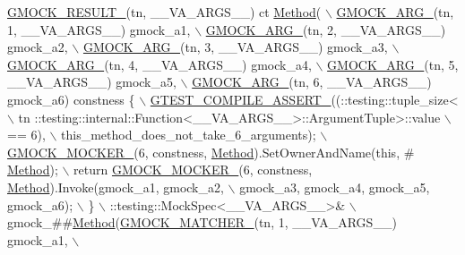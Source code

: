 \begin{DoxyCode}
\hyperlink{gmock-generated-function-mockers_8h_a0e9d94e9c77df84f1103af06feee1077}{GMOCK\_RESULT\_}(tn, \_\_VA\_ARGS\_\_) ct \hyperlink{gmock-spec-builders__test_8cc_a95606368148f3e5aab5db46c32466afd}{Method}( \(\backslash\)
      \hyperlink{gmock-generated-function-mockers_8h_a887575cc1c31158fba808180a10c004f}{GMOCK\_ARG\_}(tn, 1, \_\_VA\_ARGS\_\_) gmock\_a1, \(\backslash\)
      \hyperlink{gmock-generated-function-mockers_8h_a887575cc1c31158fba808180a10c004f}{GMOCK\_ARG\_}(tn, 2, \_\_VA\_ARGS\_\_) gmock\_a2, \(\backslash\)
      \hyperlink{gmock-generated-function-mockers_8h_a887575cc1c31158fba808180a10c004f}{GMOCK\_ARG\_}(tn, 3, \_\_VA\_ARGS\_\_) gmock\_a3, \(\backslash\)
      \hyperlink{gmock-generated-function-mockers_8h_a887575cc1c31158fba808180a10c004f}{GMOCK\_ARG\_}(tn, 4, \_\_VA\_ARGS\_\_) gmock\_a4, \(\backslash\)
      \hyperlink{gmock-generated-function-mockers_8h_a887575cc1c31158fba808180a10c004f}{GMOCK\_ARG\_}(tn, 5, \_\_VA\_ARGS\_\_) gmock\_a5, \(\backslash\)
      \hyperlink{gmock-generated-function-mockers_8h_a887575cc1c31158fba808180a10c004f}{GMOCK\_ARG\_}(tn, 6, \_\_VA\_ARGS\_\_) gmock\_a6) constness \{ \hyperlink{gtest-port_8h_ae1f37dc71d5daa6fb49ca1b6047d4a8c}{\(\backslash\)}
\hyperlink{gtest-port_8h_ae1f37dc71d5daa6fb49ca1b6047d4a8c}{    GTEST\_COMPILE\_ASSERT\_}((::testing::tuple\_size<                          \(\backslash\)
        tn ::testing::internal::Function<\_\_VA\_ARGS\_\_>::ArgumentTuple>::value \(\backslash\)
            == 6), \(\backslash\)
        this\_method\_does\_not\_take\_6\_arguments); \hyperlink{gmock-generated-function-mockers_8h_a7d362499e27b1bc3a9806dd3cf58a5b7}{\(\backslash\)}
\hyperlink{gmock-generated-function-mockers_8h_a7d362499e27b1bc3a9806dd3cf58a5b7}{    GMOCK\_MOCKER\_}(6, constness, \hyperlink{gmock-spec-builders__test_8cc_a95606368148f3e5aab5db46c32466afd}{Method}).SetOwnerAndName(\textcolor{keyword}{this}, #
      \hyperlink{gmock-spec-builders__test_8cc_a95606368148f3e5aab5db46c32466afd}{Method}); \(\backslash\)
    return \hyperlink{gmock-generated-function-mockers_8h_a7d362499e27b1bc3a9806dd3cf58a5b7}{GMOCK\_MOCKER\_}(6, constness, \hyperlink{gmock-spec-builders__test_8cc_a95606368148f3e5aab5db46c32466afd}{Method}).Invoke(gmock\_a1, gmock\_a2, \(\backslash\)
        gmock\_a3, gmock\_a4, gmock\_a5, gmock\_a6); \(\backslash\)
  \} \(\backslash\)
  ::testing::MockSpec<\_\_VA\_ARGS\_\_>& \(\backslash\)
      gmock\_##\hyperlink{gmock-spec-builders__test_8cc_a95606368148f3e5aab5db46c32466afd}{Method}(\hyperlink{gmock-generated-function-mockers_8h_aa87d0009fe91f1c89d658776b55a769c}{GMOCK\_MATCHER\_}(tn, 1, \_\_VA\_ARGS\_\_) gmock\_a1, \(\backslash\)

\end{DoxyCode}
